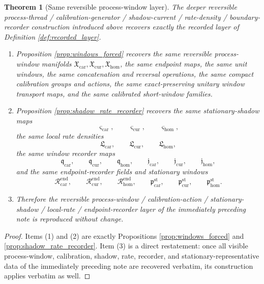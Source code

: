 \documentclass[11pt]{article}
\newcommand{\TensorWindowClass}{\mathfrak X_{\mathrm{car}}}
\newcommand{\CurWindowClass}{\mathfrak X_{\mathrm{cur}}}
\newcommand{\HomWindowClass}{\mathfrak X_{\mathrm{hom}}}
\newcommand{\TensorStatTag}{\varsigma_{\mathrm{car}}}
\newcommand{\CurStatTag}{\varsigma_{\mathrm{cur}}}
\newcommand{\HomStatTag}{\varsigma_{\mathrm{hom}}}
\newcommand{\TensorLocalRate}{\mathfrak L_{\mathrm{car}}}
\newcommand{\CurLocalRate}{\mathfrak L_{\mathrm{cur}}}
\newcommand{\HomLocalRate}{\mathfrak L_{\mathrm{hom}}}
\newcommand{\TensorWindowDensity}{\mathfrak q_{\mathrm{car}}}
\newcommand{\CurWindowDensity}{\mathfrak q_{\mathrm{cur}}}
\newcommand{\HomWindowDensity}{\mathfrak q_{\mathrm{hom}}}
\newcommand{\TensorWindowFlux}{\mathfrak j_{\mathrm{car}}}
\newcommand{\CurWindowFlux}{\mathfrak j_{\mathrm{cur}}}
\newcommand{\HomWindowFlux}{\mathfrak j_{\mathrm{hom}}}
\newcommand{\TensorEndpointReadSeed}{\mathscr R_{\mathrm{car}}^{\mathrm{end}}}
\newcommand{\CurEndpointReadSeed}{\mathscr R_{\mathrm{cur}}^{\mathrm{end}}}
\newcommand{\HomEndpointReadSeed}{\mathscr R_{\mathrm{hom}}^{\mathrm{end}}}
\newcommand{\TensorStationaryWindow}{\mathfrak p_{\mathrm{car}}^{\mathrm{st}}}
\newcommand{\CurStationaryWindow}{\mathfrak p_{\mathrm{cur}}^{\mathrm{st}}}
\newcommand{\HomStationaryWindow}{\mathfrak p_{\mathrm{hom}}^{\mathrm{st}}}
\newtheorem{theorem}{Theorem}
\begin{document}
\begin{theorem}[Same reversible process-window layer]
\label{thm:same_layer}
The deeper reversible process-thread / calibration-generator / shadow-current / rate-density / boundary-recorder construction introduced above recovers exactly the recorded layer of Definition \ref{def:recorded_layer}.
\begin{enumerate}
    \item Proposition \ref{prop:windows_forced} recovers the same reversible process-window manifolds \(\TensorWindowClass,\CurWindowClass,\HomWindowClass\), the same endpoint maps, the same unit windows, the same concatenation and reversal operations, the same compact calibration groups and actions, the same exact-preserving unitary window transport maps, and the same calibrated short-window families.
    \item Proposition \ref{prop:shadow_rate_recorder} recovers the same stationary-shadow maps
    \[
    \TensorStatTag,\qquad
    \CurStatTag,\qquad
    \HomStatTag,
    \]
    the same local rate densities
    \[
    \TensorLocalRate,\qquad
    \CurLocalRate,\qquad
    \HomLocalRate,
    \]
    the same window recorder maps
    \[
    \TensorWindowDensity,\qquad
    \CurWindowDensity,\qquad
    \HomWindowDensity,\qquad
    \TensorWindowFlux,\qquad
    \CurWindowFlux,\qquad
    \HomWindowFlux,
    \]
    and the same endpoint-recorder fields and stationary windows
    \[
    \TensorEndpointReadSeed,\qquad
    \CurEndpointReadSeed,\qquad
    \HomEndpointReadSeed,\qquad
    \TensorStationaryWindow,\qquad
    \CurStationaryWindow,\qquad
    \HomStationaryWindow.
    \]
    \item Therefore the reversible process-window / calibration-action / stationary-shadow / local-rate / endpoint-recorder layer of the immediately preceding note is reproduced without change.
\end{enumerate}
\end{theorem}

\begin{proof}
Items (1) and (2) are exactly Propositions \ref{prop:windows_forced} and \ref{prop:shadow_rate_recorder}. Item (3) is a direct restatement: once all visible process-window, calibration, shadow, rate, recorder, and stationary-representative data of the immediately preceding note are recovered verbatim, its construction applies verbatim as well.
\end{proof}
\end{document}
